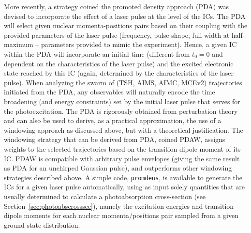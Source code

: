 \documentclass[9pt,bestpractices,pubversion]{livecoms}
\begin{document}
More recently, a strategy coined the promoted density approach (PDA) was devised to incorporate the effect of a laser pulse at the level of the ICs.\cite{janos2024including} The PDA will select given nuclear momenta-positions pairs based on their coupling with the provided parameters of the laser pulse (frequency, pulse shape, full width at half-maximum -- parameters provided to mimic the experiment). Hence, a given IC within the PDA will incorporate an initial time (different from $t_0=0$ and dependent on the characteristics of the laser pulse) and the excited electronic state reached by this IC (again, determined by the characteristics of the laser pulse). When analyzing the swarm of (TSH, AIMS, AIMC, MCEv2) trajectories initiated from the PDA, any observables will naturally encode the time broadening (and energy constraints) set by the initial laser pulse that serves for the photoexcitation.   
The PDA is rigorously obtained from perturbation theory and can also be used to derive, as a practical approximation, the use of a windowing approach as discussed above, but with a theoretical justification. The windowing strategy that can be derived from PDA, coined PDAW, assigns weights to the selected trajectories based on the transition dipole moment of its IC. PDAW is compatible with arbitrary pulse envelopes (giving the same result as PDA for an unchirped Gaussian pulse), and outperforms other windowing strategies described above. A simple code, \texttt{promdens},\cite{promdens} is available to generate the ICs for a given laser pulse automatically, using as input solely quantities that are usually determined to calculate a photoabsorption cross-section (see Section~\ref{sec:photoabscrosssec}), namely the excitation energies and transition dipole moments for each nuclear momenta/positions pair sampled from a given ground-state distribution.
\end{document}
